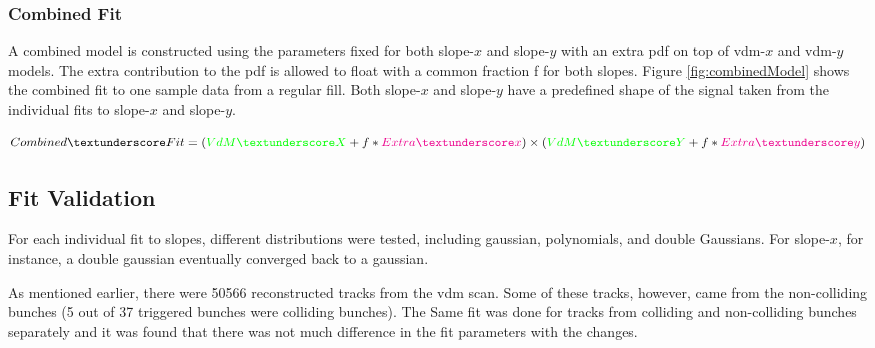 \subsubsection{Combined Fit}
A combined model is constructed using the parameters fixed for both slope-$x$ and slope-$y$ with an extra pdf on top of vdm-$x$ and vdm-$y$ models. The extra contribution to the pdf is allowed to float with a common fraction f for both slopes. Figure \ref{fig:combinedModel} shows the combined fit to one sample data from a regular fill. Both slope-$x$ and slope-$y$ have a predefined shape of the signal taken from the individual fits to slope-$x$ and slope-$y$.




$$
Combined \textunderscore Fit = \left ( {\color {green}VdM\char`_X} + f* {\color {magenta} Extra \textunderscore x} \right ) \times \left( {\color {green}VdM\char`_Y} + f* {\color {magenta} Extra \textunderscore y} \right)
$$

\subsection{Fit Validation}
For each individual fit to slopes, different distributions were tested, including gaussian, polynomials, and double Gaussians. For slope-$x$, for instance, a double gaussian eventually converged back to a gaussian. 

As mentioned earlier, there were 50566 reconstructed tracks from the vdm scan. Some of these tracks, however, came from the non-colliding bunches (5 out of 37 triggered bunches were colliding bunches). The Same fit was done for tracks from colliding and non-colliding bunches separately and it was found that there was not much difference in the fit parameters with the changes. 

%
%







